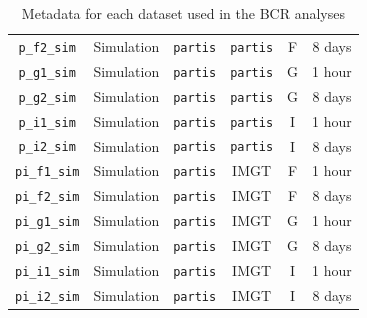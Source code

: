 \documentclass{article}
\begin{document}
\begin{table}
{\begin{tabular}{c|c|c|c|c|c}
    \texttt{p\_f2\_sim} & Simulation & \texttt{partis} & \texttt{partis} & F & 8 days\\
    \texttt{p\_g1\_sim} & Simulation & \texttt{partis} & \texttt{partis} & G & 1 hour\\
    \texttt{p\_g2\_sim} & Simulation & \texttt{partis} & \texttt{partis} & G & 8 days\\
    \texttt{p\_i1\_sim} & Simulation & \texttt{partis} & \texttt{partis} & I & 1 hour\\
    \texttt{p\_i2\_sim} & Simulation & \texttt{partis} & \texttt{partis} & I & 8 days\\
    \texttt{pi\_f1\_sim} & Simulation& \texttt{partis} & IMGT & F & 1 hour\\
    \texttt{pi\_f2\_sim} & Simulation& \texttt{partis} & IMGT & F & 8 days\\
    \texttt{pi\_g1\_sim} & Simulation& \texttt{partis} & IMGT & G & 1 hour\\
    \texttt{pi\_g2\_sim} & Simulation& \texttt{partis} & IMGT & G & 8 days\\
    \texttt{pi\_i1\_sim} & Simulation& \texttt{partis} & IMGT & I & 1 hour\\
    \texttt{pi\_i2\_sim} & Simulation& \texttt{partis} & IMGT & I & 8 days\\
\end{tabular}
}
\caption{Metadata for each dataset used in the BCR analyses}
\label{tab:Datasets}
\end{table}
\end{document}

